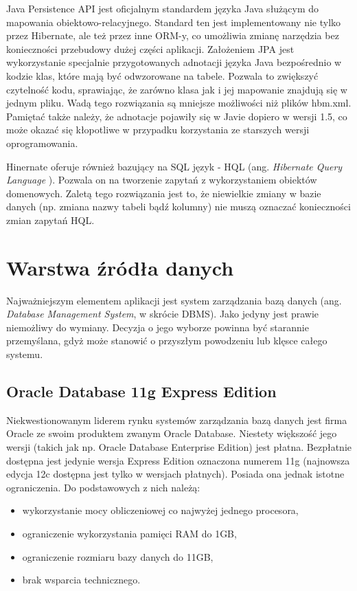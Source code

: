 Java Persistence API jest oficjalnym standardem języka Java służącym do mapowania obiektowo-relacyjnego. Standard ten jest implementowany nie tylko przez Hibernate, ale też przez inne ORM-y, co umożliwia zmianę narzędzia bez konieczności przebudowy dużej części aplikacji. Założeniem JPA jest wykorzystanie specjalnie przygotowanych adnotacji języka Java bezpośrednio w kodzie klas, które mają być odwzorowane na tabele. Pozwala to zwiększyć czytelność kodu, sprawiając, że zarówno klasa jak i jej mapowanie znajdują się w jednym pliku. Wadą tego rozwiązania są mniejsze możliwości niż plików hbm.xml. Pamiętać także należy, że adnotacje pojawiły się w Javie dopiero w wersji 1.5, co może okazać się kłopotliwe w przypadku korzystania ze starszych wersji oprogramowania.

Hinernate oferuje również bazujący na SQL język - HQL (ang. \textit{Hibernate Query Language }). Pozwala on na tworzenie zapytań z wykorzystaniem obiektów domenowych. Zaletą tego rozwiązania jest to, że niewielkie zmiany w bazie danych (np. zmiana nazwy tabeli bądź kolumny) nie muszą oznaczać konieczności zmian zapytań HQL.

\section[Warstwa źródła danych][Warstwa źródła danych]{Warstwa źródła danych}
Najważniejszym elementem aplikacji jest system zarządzania bazą danych (ang. \textit{Database Management System}, w skrócie DBMS). Jako jedyny jest prawie niemożliwy do wymiany. Decyzja o jego wyborze powinna być starannie przemyślana, gdyż może stanowić o przyszłym powodzeniu lub klęsce całego systemu.

\subsection[Oracle Database 11g Express Edition][Oracle Database 11g Express Edition]{Oracle Database 11g Express Edition} 
Niekwestionowanym liderem rynku systemów zarządzania bazą danych jest firma Oracle ze swoim produktem zwanym Oracle Database. Niestety większość jego wersji (takich jak np. Oracle Database Enterprise Edition) jest płatna. Bezpłatnie dostępna jest jedynie wersja Express Edition oznaczona numerem 11g (najnowsza edycja 12c dostępna jest tylko w wersjach płatnych).  Posiada ona jednak istotne ograniczenia. Do podstawowych z nich należą:
\begin{itemize}
	\item wykorzystanie mocy obliczeniowej co najwyżej jednego procesora,
	\item ograniczenie wykorzystania pamięci RAM do 1GB,
	\item ograniczenie rozmiaru bazy danych do 11GB,
	\item brak wsparcia technicznego.
\end{itemize}

